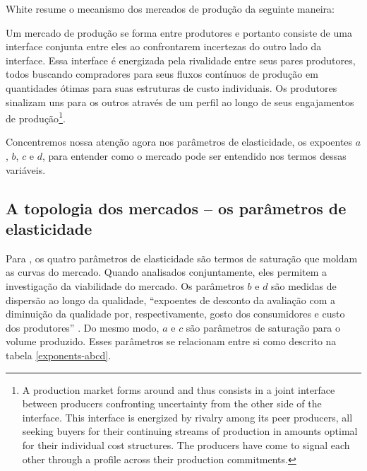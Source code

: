 \documentclass[a4paper, 12pt, openright, oneside, german, french, english, brazil]{abntex2}
\begin{document}
	White resume o mecanismo dos mercados de produção da seguinte maneira:

	\begin{citacao}
		Um mercado de produção se forma entre produtores e portanto consiste de uma interface conjunta entre eles ao confrontarem incertezas do outro lado da interface. Essa interface é energizada pela rivalidade entre seus pares produtores, todos buscando compradores para seus fluxos contínuos de produção em quantidades ótimas para suas estruturas de custo individuais. Os produtores sinalizam uns para os outros através de um perfil ao longo de seus engajamentos de produção\footnote{A production market forms around and thus consists in a joint interface between producers confronting uncertainty from the other side of the interface. This interface is energized by rivalry among its peer producers, all seeking buyers for their continuing streams of production in amounts optimal for their individual cost structures. The producers have come to signal each other through a profile across their production commitments.}. \cite[p. 27]{white2002markets}
	\end{citacao}

	Concentremos nossa atenção agora nos parâmetros de elasticidade, os expoentes $a$, $b$, $c$ e $d$, para entender como o mercado pode ser entendido nos termos dessas variáveis.
	
	
	
	\subsection{A topologia dos mercados -- os parâmetros de elasticidade}
	
	
	Para , os quatro parâmetros de elasticidade são termos de saturação que moldam as curvas do mercado. Quando analisados conjuntamente, eles permitem a investigação da viabilidade do mercado. Os parâmetros $b$ e $d$ são medidas de dispersão ao longo da qualidade, ``expoentes de desconto da avaliação com a diminuição da qualidade por, respectivamente, gosto dos consumidores e custo dos produtores'' \cite[p. 50]{white2002markets}.  Do mesmo modo, $a$ e $c$ são parâmetros de saturação  para o volume produzido. Esses parâmetros se relacionam entre si como descrito na tabela \ref{exponents-abcd}.
	
\end{document}
